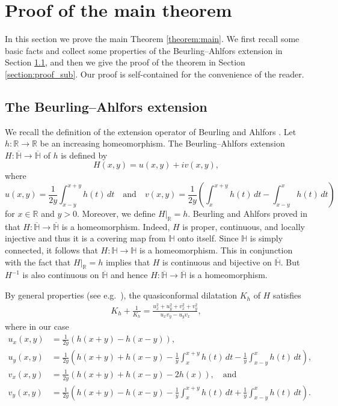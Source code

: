 \documentclass{amsart}
\theoremstyle{plain}
\theoremstyle{definition}
\theoremstyle{remark}
\numberwithin{equation}{section}
\numberwithin{theorem}{section}
\numberwithin{conjecture}{section}
\newcommand{\R}{\mathbb R}
\newcommand{\1}{\mathbf 1}
\newcommand{\UHP}{\mathbb H}
\begin{document}
\bigskip

\section{Proof of the main theorem}\label{section:proof_main}

In this section we prove the main Theorem \ref{theorem:main}. We first recall some basic facts and collect some properties of the Beurling--Ahlfors extension in Section \ref{section:beurling_ahlfors}, and then we give the proof of the theorem in Section \ref{section:proof_sub}. Our proof is self-contained for the convenience of the reader.


\subsection{The Beurling--Ahlfors extension}\label{section:beurling_ahlfors}

We recall the definition of the extension operator of Beurling and Ahlfors \cite{BeurlingAhlfors:extension}. Let $h \colon \R \to \R$ be an increasing homeomorphism. The Beurling--Ahlfors extension $H:\overline{\UHP} \to \overline{\UHP}$  of $h$ is defined by 
$$H(x,y)=u(x,y)+iv(x,y),$$
where
$$u(x,y)=\frac{1}{2y}\int_{x-y}^{x+y} h(t)\,dt \quad \textrm{and}\quad v(x,y)=\frac{1}{2y}\left( \int_{x}^{x+y} h(t)\,dt - \int_{x-y}^{x} h(t)\,dt\right)$$
for $x\in \R$ and $y>0$. Moreover, we define $H|_{\R}=h$. Beurling and Ahlfors proved in \cite[p.~135]{BeurlingAhlfors:extension} that $H:\overline{\UHP} \to \overline{\UHP}$ is a homeomorphism. Indeed, $H$ is proper, continuous, and locally injective and thus it is a covering map from  $\UHP$ onto itself. Since $\UHP$ is simply connected, it follows that $H:\UHP \to \UHP$ is a homeomorphism. This in conjunction with the fact that $H|_{\R}=h$ implies that $H$ is continuous and bijective on $\overline{\UHP}$. But $H^{-1}$ is also continuous on $\overline{\UHP}$ and hence $H:\overline{\UHP} \to \overline{\UHP}$ is a homeomorphism.

By general properties (see e.g.\ \cite[(21.1), p.~587]{AstalaIwaniecMartin:quasiconformal}), the quasiconformal dilatation $K_h$ of $H$ satisfies
\begin{align}\label{dilatation}
K_h+\frac{1}{K_h}=\frac{u_x^2+u_y^2+v_x^2+v_y^2}{u_xv_y-u_yv_x},
\end{align}
where in our case
\begin{align*}
u_x(x,y)&=\frac{1}{2y}\left(h(x+y)-h(x-y)\right),\\
u_y(x,y)&=\frac{1}{2y}\left( h(x+y)+h(x-y)-\frac{1}{y}\int_x^{x+y}h(t)\, dt-\frac{1}{y}\int_{x-y}^x h(t)\,dt\right),\\
v_x(x,y)&=\frac{1}{2y}\left(h(x+y)+h(x-y)-2h(x)\right), \quad \textrm{and}\\
v_y(x,y)&=\frac{1}{2y}\left( h(x+y)-h(x-y)-\frac{1}{y}\int_x^{x+y}h(t)\,dt+\frac{1}{y}\int_{x-y}^x h(t)\,dt\right).
\end{align*}
\end{document}
